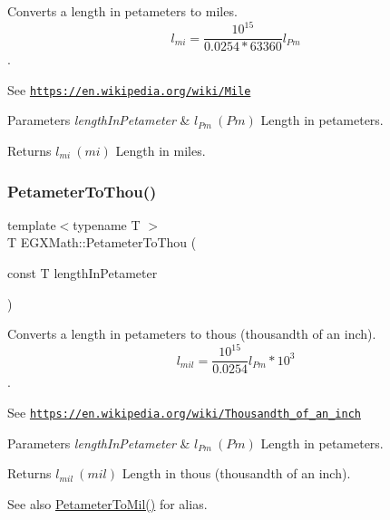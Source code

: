 Converts a length in petameters to miles. \[ l_{mi}=\frac{10^{15}}{0.0254 * 63360} l_{Pm} \]. 

See \href{https://en.wikipedia.org/wiki/Mile}{\tt https\+://en.\+wikipedia.\+org/wiki/\+Mile} 
\begin{DoxyParams}{Parameters}
{\em length\+In\+Petameter} & $ l_{Pm}\ (Pm)$ Length in petameters. \\
\hline
\end{DoxyParams}
\begin{DoxyReturn}{Returns}
$ l_{mi}\ (mi)$ Length in miles. 
\end{DoxyReturn}
\mbox{\label{group___e_g_x_math-_conversions-_length_conversions-_s_i-_petameter-_imperial_gadcb69779fdf2696d6b9e13e2b23e6216}} 
\subsubsection{\texorpdfstring{Petameter\+To\+Thou()}{PetameterToThou()}}
{\footnotesize\ttfamily template$<$typename T $>$ \\
T E\+G\+X\+Math\+::\+Petameter\+To\+Thou (\begin{DoxyParamCaption}\item[{const T}]{length\+In\+Petameter }\end{DoxyParamCaption})}



Converts a length in petameters to thous (thousandth of an inch). \[ l_{mil}= \frac{10^{15}}{0.0254} l_{Pm} * 10^{3} \]. 

See \href{https://en.wikipedia.org/wiki/Thousandth_of_an_inch}{\tt https\+://en.\+wikipedia.\+org/wiki/\+Thousandth\+\_\+of\+\_\+an\+\_\+inch} 
\begin{DoxyParams}{Parameters}
{\em length\+In\+Petameter} & $ l_{Pm}\ (Pm)$ Length in petameters. \\
\hline
\end{DoxyParams}
\begin{DoxyReturn}{Returns}
$ l_{mil}\ (mil)$ Length in thous (thousandth of an inch). 
\end{DoxyReturn}
\begin{DoxySeeAlso}{See also}
\mbox{\hyperlink{group___e_g_x_math-_conversions-_length_conversions-_s_i-_petameter-_imperial_ga044a0e99c9e8335dc196daf1efb9c90f}{Petameter\+To\+Mil()}} for alias. 
\end{DoxySeeAlso}
\mbox{\label{group___e_g_x_math-_conversions-_length_conversions-_s_i-_petameter-_imperial_gadd453d20eef89db280c71397046d5dcd}} 
